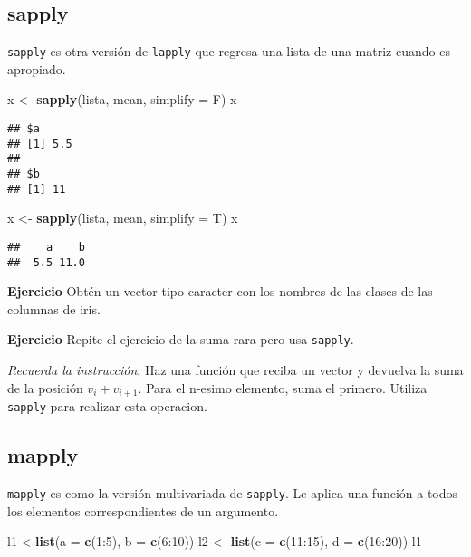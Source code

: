 \documentclass[]{article}
\newenvironment{Shaded}{\begin{snugshade}}{\end{snugshade}}
\newcommand{\KeywordTok}[1]{\textcolor[rgb]{0.13,0.29,0.53}{\textbf{{#1}}}}
\newcommand{\DataTypeTok}[1]{\textcolor[rgb]{0.13,0.29,0.53}{{#1}}}
\newcommand{\DecValTok}[1]{\textcolor[rgb]{0.00,0.00,0.81}{{#1}}}
\newcommand{\StringTok}[1]{\textcolor[rgb]{0.31,0.60,0.02}{{#1}}}
\newcommand{\NormalTok}[1]{{#1}}
\begin{document}
\subsection{sapply}\label{sapply}

\texttt{sapply} es otra versión de \texttt{lapply} que regresa una lista
de una matriz cuando es apropiado.

\begin{Shaded}
\begin{Highlighting}[]
\NormalTok{x <-}\StringTok{ }\KeywordTok{sapply}\NormalTok{(lista, mean, }\DataTypeTok{simplify =} \NormalTok{F)}
\NormalTok{x}
\end{Highlighting}
\end{Shaded}

\begin{verbatim}
## $a
## [1] 5.5
## 
## $b
## [1] 11
\end{verbatim}

\begin{Shaded}
\begin{Highlighting}[]
\NormalTok{x <-}\StringTok{ }\KeywordTok{sapply}\NormalTok{(lista, mean, }\DataTypeTok{simplify =} \NormalTok{T)}
\NormalTok{x}
\end{Highlighting}
\end{Shaded}

\begin{verbatim}
##    a    b 
##  5.5 11.0
\end{verbatim}

\textbf{Ejercicio} Obtén un vector tipo caracter con los nombres de las
clases de las columnas de iris.

\textbf{Ejercicio} Repite el ejercicio de la suma rara pero usa
\texttt{sapply}.

\emph{Recuerda la instrucción}: Haz una función que reciba un vector y
devuelva la suma de la posición $v_i + v_{i + 1}$. Para el n-esimo
elemento, suma el primero. Utiliza \texttt{sapply} para realizar esta
operacion.

\subsection{mapply}\label{mapply}

\texttt{mapply} es como la versión multivariada de \texttt{sapply}. Le
aplica una función a todos los elementos correspondientes de un
argumento.

\begin{Shaded}
\begin{Highlighting}[]
\NormalTok{l1 <-}\KeywordTok{list}\NormalTok{(}\DataTypeTok{a =} \KeywordTok{c}\NormalTok{(}\DecValTok{1}\NormalTok{:}\DecValTok{5}\NormalTok{), }\DataTypeTok{b =} \KeywordTok{c}\NormalTok{(}\DecValTok{6}\NormalTok{:}\DecValTok{10}\NormalTok{))}
\NormalTok{l2 <-}\StringTok{ }\KeywordTok{list}\NormalTok{(}\DataTypeTok{c =} \KeywordTok{c}\NormalTok{(}\DecValTok{11}\NormalTok{:}\DecValTok{15}\NormalTok{), }\DataTypeTok{d =} \KeywordTok{c}\NormalTok{(}\DecValTok{16}\NormalTok{:}\DecValTok{20}\NormalTok{))}
\NormalTok{l1}
\end{Highlighting}
\end{Shaded}
\end{document}
